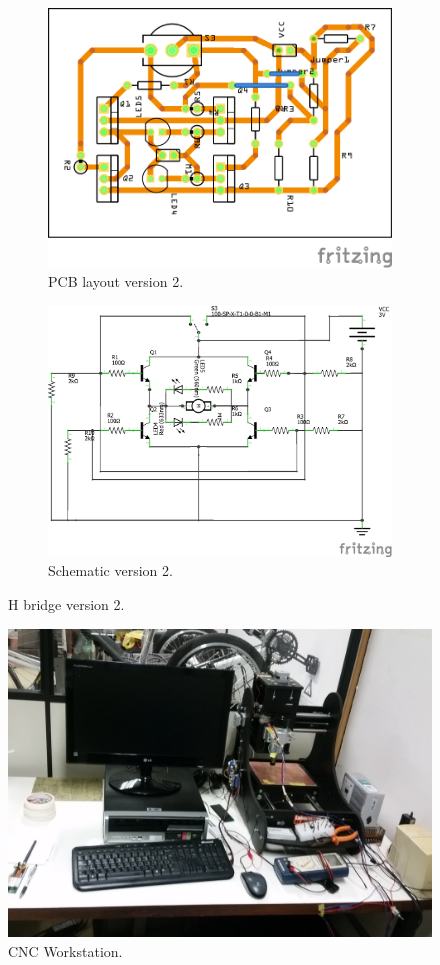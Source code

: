 \begin{figure}[t]
\centering
\begin{subfigure}{\columnwidth}
\centering%
\includegraphics[height=.55\textwidth]{img/ponteH_pcb_new.png}
\caption{PCB layout version 2.}
\label{fig:new_layout}%
\end{subfigure}

\begin{subfigure}{\columnwidth}
\centering%
\includegraphics[height=.55\textwidth]{img/ponteH_schem_new.png}
\caption{Schematic version 2.}
\label{fig:new_schem}%
\end{subfigure}
\label{fig:h_schem_v2}
\caption{H bridge version 2.}
\end{figure}

\begin{figure}[t]
\centering
\centering%
\includegraphics[height=.35\textwidth]{img/workstation_cnc.jpg}
\caption{CNC Workstation.}
\label{fig:workstation}%
\end{figure}

